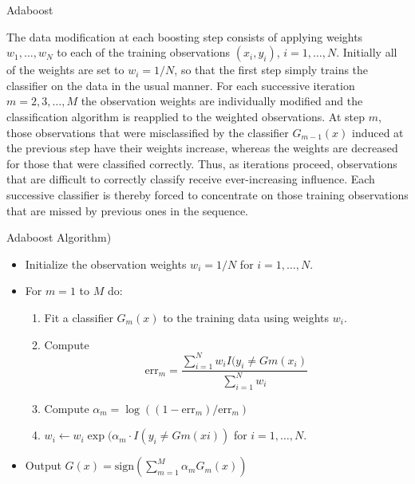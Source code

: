 \documentclass{beamer}
\begin{document}
\begin{frame}{Adaboost}
	
	The data modification at each boosting step consists of applying weights $w_1,\ldots, w_N$ to each of the training observations $(x_i,y_i)$, $i=1,\ldots, N$. Initially all of the weights are set to $w_i = 1/N$, so that the first step simply trains the classifier on the data in the usual manner. For each successive iteration $m=2,3, \ldots, M$ the observation weights are individually modified and the classification algorithm is reapplied to the weighted observations. At step $m$, those observations that were misclassified by the classifier $G_{m-1}(x)$ induced at the previous step have their weights increase, whereas the weights are decreased for those that were classified correctly. Thus, as iterations proceed, observations that are difficult to correctly classify receive ever-increasing influence. Each successive classifier is thereby forced to concentrate on those training observations that are missed by previous ones in the sequence. 
	
\end{frame}
\begin{frame}{Adaboost Algorithm)}
	\begin{itemize}
		\item Initialize the observation weights $w_i=1/N$ for $i=1,\ldots, N$.
		\item For $m=1$ to $M$ do:
		\begin{enumerate}
			\item Fit a classifier $G_m(x)$ to the training data using weights $w_i$.
			\item Compute
			\begin{equation*}
				\text{err}_m = \frac{\sum_{i=1}^N w_i I(y_i\ne Gm(x_i)}{\sum_{i=1}^{N}w_i}
			\end{equation*}
			\item Compute $\alpha_m = \log((1- \text{err}_m)/\text{err}_m)$
			\item $w_i \leftarrow w_i \exp( \alpha_m \cdot I (y_i \ne Gm(xi))$ for $i=1, \ldots, N$.
		\end{enumerate}
	\item Output $G(x)= \text{sign} \left(\sum_{m=1}^M\alpha_m G_m(x)\right)$
	\end{itemize}
\end{frame}
\end{document}
